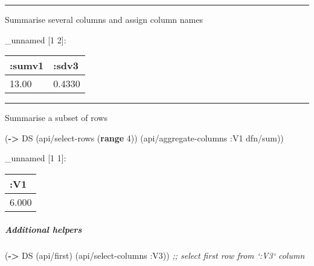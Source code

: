\documentclass[]{article}
\newenvironment{Shaded}{\begin{snugshade}}{\end{snugshade}}
\newcommand{\KeywordTok}[1]{\textcolor[rgb]{0.13,0.29,0.53}{\textbf{#1}}}
\newcommand{\DecValTok}[1]{\textcolor[rgb]{0.00,0.00,0.81}{#1}}
\newcommand{\CommentTok}[1]{\textcolor[rgb]{0.56,0.35,0.01}{\textit{#1}}}
\newcommand{\VariableTok}[1]{\textcolor[rgb]{0.00,0.00,0.00}{#1}}
\newcommand{\AttributeTok}[1]{\textcolor[rgb]{0.77,0.63,0.00}{#1}}
\newcommand{\NormalTok}[1]{#1}
\let\oldsubparagraph\subparagraph
\renewcommand{\subparagraph}[1]{\oldsubparagraph{#1}\mbox{}}
\begin{document}
\begin{center}\rule{0.5\linewidth}{0.5pt}\end{center}

Summarise several columns and assign column names

\begin{Shaded}
\end{Shaded}

\_unnamed {[}1 2{]}:

\begin{longtable}[]{@{}ll@{}}
\toprule
:sumv1 & :sdv3\tabularnewline
\midrule
\endhead
13.00 & 0.4330\tabularnewline
\bottomrule
\end{longtable}

\begin{center}\rule{0.5\linewidth}{0.5pt}\end{center}

Summarise a subset of rows

\begin{Shaded}
\begin{Highlighting}[]
\NormalTok{(}\KeywordTok{->}\NormalTok{ DS}
\NormalTok{    (api/select-rows (}\KeywordTok{range} \DecValTok{4}\NormalTok{))}
\NormalTok{    (api/aggregate-columns }\AttributeTok{:V1}\NormalTok{ dfn/sum))}
\end{Highlighting}
\end{Shaded}

\_unnamed {[}1 1{]}:

\begin{longtable}[]{@{}l@{}}
\toprule
:V1\tabularnewline
\midrule
\endhead
6.000\tabularnewline
\bottomrule
\end{longtable}

\subparagraph{Additional helpers}\label{additional-helpers}

\begin{Shaded}
\begin{Highlighting}[]
\NormalTok{(}\KeywordTok{->}\NormalTok{ DS}
\NormalTok{    (api/first)}
\NormalTok{    (api/select-columns }\AttributeTok{:V3}\NormalTok{)) }\CommentTok{;; select first row from `:V3` column}
\end{Highlighting}
\end{Shaded}
\end{document}
